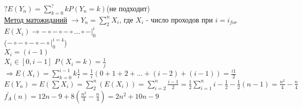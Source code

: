 \documentclass[12pt]{report}
\begin{document}
\begin{enumerate}
		$?E(Y_n) = \sum_{k=0}^{?}kP(Y_n=k)$(не подходит)\\
		\underline{Метод матожиданий} $\rightarrow Y_n = \sum_{2}^{n} X_i$, где $X_i$ - число проходов при $i = i_{for}$\\
		$E(X_i) \rightarrow -\circ -\circ -\circ ... \circ - |_{0}^i$\\
		($-\circ -\circ -\circ -\circ |_{0}^{i=4}$)\\
		$X_i = (i-1)$\\
		$X_i \in [0, i-1]$ $P(X_i = k)=\frac{1}{j}$\\
		$\Rightarrow E(X_i)=\sum_{k=0}^{i-1}k\frac{1}{i} = \frac{1}{i}(0+1+2+...+(i-2)+(i-1))=\frac{i1}{2}$\\
		$E(Y_n)=E(\sum X_i)=\sum_{2}^{n}(E(X_i))=\sum_{i=2}^{n}\frac{i-1}{2} = \frac{1}{2}\sum_{i=1}^{n}i - \frac{1}{2} -\frac{1}{2}(n-1)=\frac{n^2}{4}-\frac{n}{4}$\\
		$\bar{f_A}(n)=12n-9+8(\frac{n^2}{4}-\frac{n}{4}) = 2n^2 + 10n - 9$
	\end{enumerate}
\end{document}
